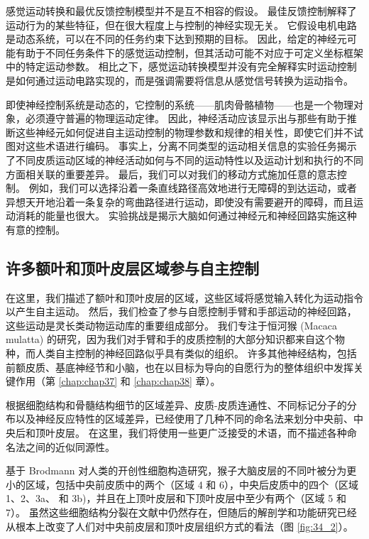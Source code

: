 感觉运动转换和最优反馈控制模型并不是互不相容的假设。 最佳反馈控制解释了运动行为的某些特征，但在很大程度上与控制的神经实现无关。 它假设电机电路是动态系统，可以在不同的任务约束下达到预期的目标。 因此，给定的神经元可能有助于不同任务条件下的感觉运动控制，但其活动可能不对应于可定义坐标框架中的特定运动参数。 相比之下，感觉运动转换模型并没有完全解释实时运动控制是如何通过运动电路实现的，而是强调需要将信息从感觉信号转换为运动指令。

即使神经控制系统是动态的，它控制的系统——肌肉骨骼植物——也是一个物理对象，必须遵守普遍的物理运动定律。 因此，神经活动应该显示出与那些有助于推断这些神经元如何促进自主运动控制的物理参数和规律的相关性，即使它们并不试图对这些术语进行编码。 事实上，分离不同类型的运动相关信息的实验任务揭示了不同皮质运动区域的神经活动如何与不同的运动特性以及运动计划和执行的不同方面相关联的重要差异。 最后，我们可以对我们的移动方式施加任意的意志控制。 例如，我们可以选择沿着一条直线路径高效地进行无障碍的到达运动，或者异想天开地沿着一条复杂的弯曲路径进行运动，即使没有需要避开的障碍，而且运动消耗的能量也很大。 实验挑战是揭示大脑如何通过神经元和神经回路实施这种有意的控制。


\subsection{许多额叶和顶叶皮层区域参与自主控制}
在这里，我们描述了额叶和顶叶皮层的区域，这些区域将感觉输入转化为运动指令以产生自主运动。 然后，我们检查了参与自愿控制手臂和手部运动的神经回路，这些运动是灵长类动物运动库的重要组成部分。 我们专注于恒河猴 (Macaca mulatta) 的研究，因为我们对手臂和手的皮质控制的大部分知识都来自这个物种，而人类自主控制的神经回路似乎具有类似的组织。 许多其他神经结构，包括前额皮质、基底神经节和小脑，也在以目标为导向的自愿行为的整体组织中发挥关键作用（第 \ref{chap:chap37} 和 \ref{chap:chap38} 章）。

根据细胞结构和骨髓结构细节的区域差异、皮质-皮质连通性、不同标记分子的分布以及神经反应特性的区域差异，已经使用了几种不同的命名法来划分中央前、中央后和顶叶皮层。 在这里，我们将使用一些更广泛接受的术语，而不描述各种命名法之间的近似同源性。

基于 Brodmann 对人类的开创性细胞构造研究，猴子大脑皮层的不同叶被分为更小的区域，包括中央前皮质中的两个（区域 4 和 6），中央后皮质中的四个（区域 1、2、3a、 和 3b)，并且在上顶叶皮层和下顶叶皮层中至少有两个（区域 5 和 7）。 
虽然这些细胞结构分裂在文献中仍然存在，但随后的解剖学和功能研究已经从根本上改变了人们对中央前皮层和顶叶皮层组织方式的看法（图 \ref{fig:34_2}）。

